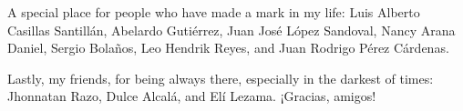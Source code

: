 A special place for people who have made a mark in my life: Luis Alberto Casillas Santill\'an, Abelardo Guti\'errez, Juan Jos\'e L\'opez Sandoval, Nancy Arana Daniel, Sergio Bola\~nos, Leo Hendrik Reyes, and Juan Rodrigo P\'erez C\'ardenas.

Lastly, my friends, for being always there, especially in the darkest of times: Jhonnatan Razo, Dulce Alcal\'a, and El\'i Lezama. ¡Gracias, amigos!